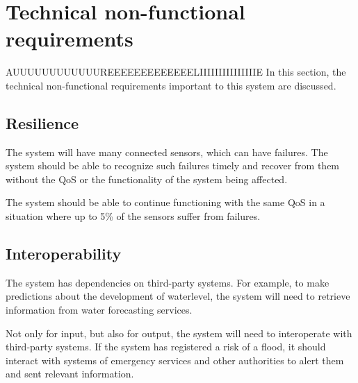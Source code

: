 \section{Technical non-functional requirements}
AUUUUUUUUUUUUREEEEEEEEEEEEELIIIIIIIIIIIIIIIE
In this section, the technical non-functional requirements important to this system are discussed.

\subsection{Resilience}
The system will have many connected sensors, which can have failures. The system should be able to recognize such failures timely and recover from them without the QoS or the functionality of the system being affected. 

The system should be able to continue functioning with the same QoS in a situation where up to 5\% of the sensors suffer from failures.  %

\subsection{Interoperability}
The system has dependencies on third-party systems. For example, to make predictions about the development of waterlevel, the system will need to retrieve information from water forecasting services. 

Not only for input, but also for output, the system will need to interoperate with third-party systems. If the system has registered a risk of a flood, it should interact with systems of emergency services and other authorities to alert them and sent relevant information.


